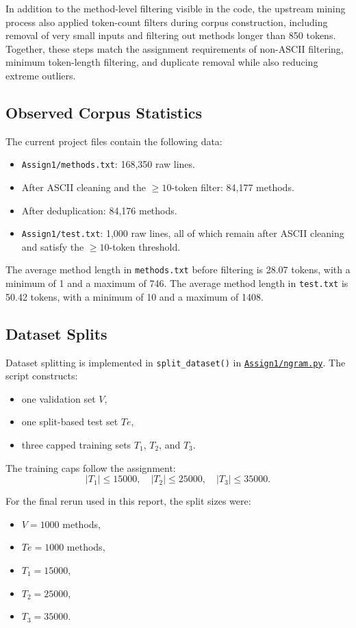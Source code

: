 \documentclass[11pt]{article}
\newcommand{\repoURL}{https://github.com/ABasloe/CSCI555}
\begin{document}
In addition to the method-level filtering visible in the code, the upstream mining process also applied token-count filters during corpus construction, including removal of very small inputs and filtering out methods longer than 850 tokens. Together, these steps match the assignment requirements of non-ASCII filtering, minimum token-length filtering, and duplicate removal while also reducing extreme outliers.

\subsection{Observed Corpus Statistics}
The current project files contain the following data:
\begin{itemize}[leftmargin=*]
  \item \texttt{Assign1/methods.txt}: 168,350 raw lines.
  \item After ASCII cleaning and the \(\geq 10\)-token filter: 84,177 methods.
  \item After deduplication: 84,176 methods.
  \item \texttt{Assign1/test.txt}: 1,000 raw lines, all of which remain after ASCII cleaning and satisfy the \(\geq 10\)-token threshold.
\end{itemize}

The average method length in \texttt{methods.txt} before filtering is 28.07 tokens, with a minimum of 1 and a maximum of 746. The average method length in \texttt{test.txt} is 50.42 tokens, with a minimum of 10 and a maximum of 1408.

\subsection{Dataset Splits}
Dataset splitting is implemented in \texttt{split\_dataset()} in \href{\repoURL/blob/main/Assign1/ngram.py}{\texttt{Assign1/ngram.py}}. The script constructs:
\begin{itemize}[leftmargin=*]
  \item one validation set \(V\),
  \item one split-based test set \(Te\),
  \item three capped training sets \(T_1\), \(T_2\), and \(T_3\).
\end{itemize}

The training caps follow the assignment:
\[
|T_1| \leq 15000,\quad |T_2| \leq 25000,\quad |T_3| \leq 35000.
\]

For the final rerun used in this report, the split sizes were:
\begin{itemize}[leftmargin=*]
  \item \(V = 1000\) methods,
  \item \(Te = 1000\) methods,
  \item \(T_1 = 15000\),
  \item \(T_2 = 25000\),
  \item \(T_3 = 35000\).
\end{itemize}
\end{document}
